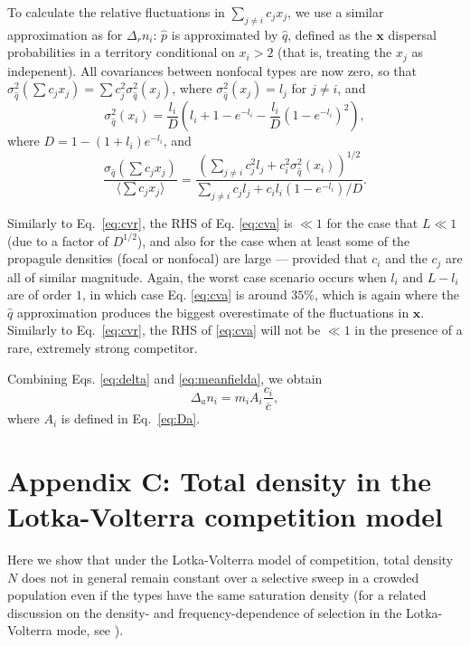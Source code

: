 \documentclass[11pt]{article}
\begin{document}
To calculate the relative fluctuations in $\sum_{j\neq i} c_j x_j$, we use a similar approximation as for $\Delta_r n_i$: $\hat{p}$ is approximated by $\hat{q}$, defined as the ${\mathbf x}$ dispersal probabilities in a territory conditional on $x_i>2$ (that is, treating the $x_j$ as indepenent). All covariances between nonfocal types are now zero, so that $\sigma_{\hat{q}}^2(\sum c_j x_j)=\sum c_j^2 \sigma_{\hat{q}}^2(x_j)$, where $\sigma_{\hat{q}}^2(x_j)=l_j$ for $j\neq i$, and  
\begin{equation}
\sigma_{\hat{q}}^2(x_i)=\frac{l_i}{D}\left(l_i+1-e^{-l_i}-\frac{l_i}{D}\left(1-e^{-l_i}\right)^2\right),
\end{equation}
where $D= 1-(1+l_i)e^{-l_i}$, and 
\begin{equation}
\frac{\sigma_{\hat{q}}(\sum c_j x_j)}{\langle\sum c_j x_j\rangle} = \frac{\left(\sum_{j\neq i} c_j^2 l_j + c_i^2 \sigma_{\hat{q}}^2(x_i)\right)^{1/2}}{\sum_{j\neq i} c_j l_j + c_i l_i (1-e^{-l_i})/D} \label{eq:cva}.
\end{equation}

Similarly to Eq.~\eqref{eq:cvr}, the RHS of Eq. \eqref{eq:cva} is $\ll 1$ for the case that $L \ll 1$ (due to a factor of $D^{1/2}$), and also for the case when at least some of the propagule densities (focal or nonfocal) are large --- provided that $c_i$ and the $c_j$ are all of similar magnitude. Again, the worst case scenario occurs when $l_i$ and $L-l_i$ are of order $1$, in which case Eq. \eqref{eq:cva} is around $35\%$, which is again where the $\hat{q}$ approximation produces the biggest overestimate of the fluctuations in ${\mathbf x}$. Similarly to Eq.~\eqref{eq:cvr}, the RHS of \eqref{eq:cva} will not be $\ll 1$ in the presence of a rare, extremely strong competitor.  

Combining Eqs. \eqref{eq:delta} and \eqref{eq:meanfielda}, we obtain
\begin{equation}
\Delta_a n_i=m_i A_i \frac{c_i}{\overline{c}},
\end{equation}
where $A_i$ is defined in Eq.~\eqref{eq:Da}.

\section*{Appendix C: Total density in the Lotka-Volterra competition model}

Here we show that under the Lotka-Volterra model of competition, total density $N$ does not in general remain constant over a selective sweep in a crowded population even if the types have the same saturation density (for a related discussion on the density- and frequency-dependence of selection in the Lotka-Volterra mode, see \citep{smouse_1976,mallet_2012}).
\end{document}

